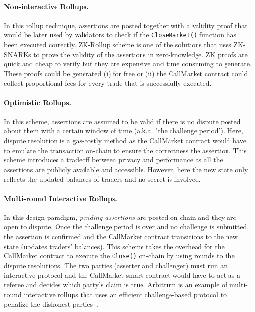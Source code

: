 \paragraph{Non-interactive Rollups.} In this rollup technique, assertions are posted together with a validity proof that would be later used by validators to check if the \texttt{CloseMarket()} function has been executed correctly. ZK-Rollup scheme is one of the solutions that uses ZK-SNARKs to prove the validity of the assertions in zero-knowledge. ZK proofs are quick and cheap to verify but they are expensive and time consuming to generate. These proofs could be generated (i) for free or (ii) the CallMarket contract could collect proportional fees for every trade that is successfully executed.

\paragraph{Optimistic Rollups.} In this scheme, assertions are assumed to be valid if there is no dispute posted about them with a certain window of time (a.k.a. "the challenge period'). Here, dispute resolution is a gas-costly method as the CallMarket contract would have to emulate the transaction on-chain to ensure the correctness the assertion. This scheme introduces a tradeoff between privacy and performance as all the assertions are publicly available and accessible. However, here the new state only reflects the updated balances of traders and no secret is involved. 

\paragraph{{Multi-round Interactive Rollups.}} In this design paradigm, \textit{pending assertions} are posted on-chain and they are open to dispute. Once the challenge period is over and no challenge is submitted, the assertion is confirmed and the CallMarket contract transitions to the new state (\ie updates traders' balances). This scheme takes the overhead for the CallMarket contract to execute the \texttt{Close()} on-chain by using rounds to the dispute resolutions. The two parties (asserter and challenger) must run an interactive protocol and the CallMarket smart contract would have to act as a referee and decides which party's claim is true. Arbitrum is an example of multi-round interactive rollups that uses an efficient challenge-based protocol to penalize the dishonest parties~\cite{kalodner2018arbitrum}. 

